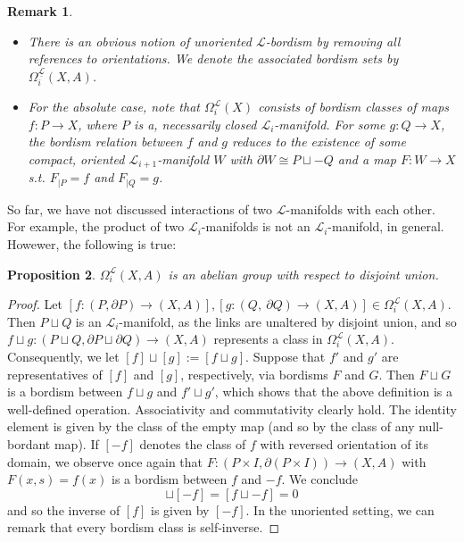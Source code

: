 \documentclass{scrreprt}
\newtheorem{prop}{Proposition}[chapter]
\newtheorem{remark}[prop]{Remark}
\begin{document}
\begin{remark}
\begin{itemize}
\item[1.] There is an obvious notion of unoriented $\mathcal{L}$-bordism by removing all references to orientations. We denote the associated bordism sets by $\Omega_i^{\underline{\mathcal{L}}}(X,A)$.
\item[2.] For the absolute case, note that $\Omega_i^{\mathcal{L}}(X)$ consists of bordism classes of maps $f: P \to X$, where $P$ is a, necessarily closed $\mathcal{L}_i$-manifold. For some $g: Q \to X$, the bordism relation between $f$ and $g$ reduces to the existence of some compact, oriented $\mathcal{L}_{i+1}$-manifold $W$ with $\partial W \cong P \sqcup -Q$ and a map $F: W \to X$ s.t. $F_{|P}=f$ and $F_{|Q}=g$.
\end{itemize}
\end{remark}

So far, we have not discussed interactions of two $\mathcal{L}$-manifolds with each other. For example, the product of two $\mathcal{L}_i$-manifolds is not an $\mathcal{L}_i$-manifold, in general. Howewer, the following is true:

\begin{prop}
$\Omega_i^{\mathcal{L}}(X,A)$ is an abelian group with respect to disjoint union.
\end{prop}

\begin{proof}
Let $[f: (P, \partial P) \to (X,A)], [g: (Q,\ \partial Q) \to (X,A)] \in \Omega_i^{\mathcal{L}}(X,A)$. Then $P \sqcup Q$ is an $\mathcal{L}_i$-manifold, as the links are unaltered by disjoint union, and so $f \sqcup g: (P \sqcup Q, \partial P \sqcup \partial Q) \to (X,A)$ represents a class in $\Omega_i^{\mathcal{L}}(X,A)$. Consequently, we let $[f] \sqcup [g]:= [f \sqcup g]$. Suppose that $f'$ and $g'$ are representatives of $[f]$ and $[g]$, respectively, via bordisms $F$ and $G$. Then $F \sqcup G$ is a bordism between $f \sqcup g$ and $f' \sqcup g'$, which shows that the above definition is a well-defined operation. Associativity and commutativity clearly hold. The identity element is given by the class of the empty map (and so by the class of any null-bordant map). If $[-f]$ denotes the class of $f$ with reversed orientation of its domain, we observe once again that $F: (P \times I, \partial(P \times I)) \to (X,A)$ with $F(x,s)=f(x)$ is a bordism between $f$ and $-f$. We conclude
\begin{equation*}
[f] \sqcup [-f] = [f \sqcup -f] = 0 
\end{equation*}
and so the inverse of $[f]$ is given by $[-f]$. In the unoriented setting, we can remark that every bordism class is self-inverse.
\end{proof}
\end{document}
